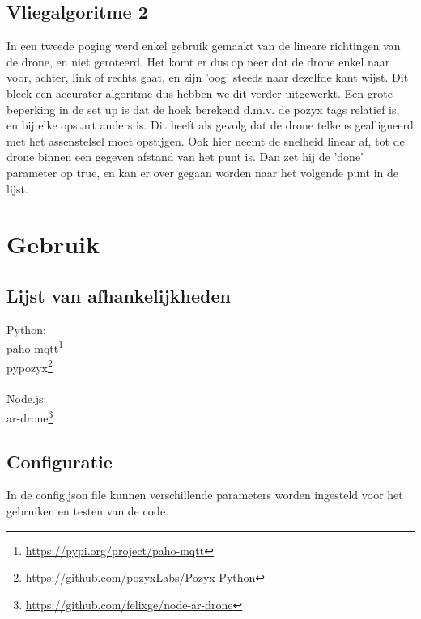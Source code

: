 \subsection{Vliegalgoritme 2}

In een tweede poging werd enkel gebruik gemaakt van de lineare richtingen van de drone, en niet geroteerd. Het komt er dus op neer dat de drone enkel naar voor, achter, link of rechts gaat, en zijn 'oog' steeds naar dezelfde kant wijst. Dit bleek een accurater algoritme dus hebben we dit verder uitgewerkt. Een grote beperking in de set up is dat de hoek berekend d.m.v. de pozyx tags relatief is, en bij elke opstart anders is. Dit heeft als gevolg dat de drone telkens gealligneerd met het assenstelsel moet opstijgen. Ook hier neemt de snelheid linear af, tot de drone binnen een gegeven afstand van het punt is. Dan zet hij de 'done' parameter op true, en kan er over gegaan worden naar het volgende punt in de lijst.

\section{Gebruik}

\subsection{Lijst van afhankelijkheden}

Python:\\
paho-mqtt\footnote{\url{https://pypi.org/project/paho-mqtt}}\\
pypozyx\footnote{\url{https://github.com/pozyxLabs/Pozyx-Python}}\\
\\
Node.js:\\
ar-drone\footnote{\url{https://github.com/felixge/node-ar-drone}}\\

\subsection{Configuratie}

In de config.json file kunnen verschillende parameters worden ingesteld voor het gebruiken en testen van de code. \\

